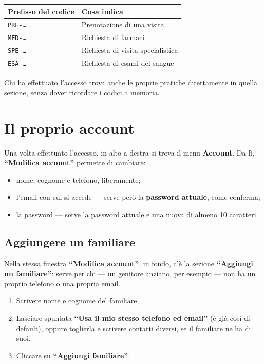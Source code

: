 \documentclass[11pt,a4paper]{article}
\newcommand{\schermata}[1]{\textbf{\color{studioteal}#1}}
\newcommand{\bottone}[1]{\textbf{``#1''}}
\begin{document}
\begin{center}
\begin{tabularx}{\linewidth}{lX}
\toprule
\textbf{Prefisso del codice} & \textbf{Cosa indica} \\
\midrule
\texttt{PRE-\dots} & Prenotazione di una visita \\
\texttt{MED-\dots} & Richiesta di farmaci \\
\texttt{SPE-\dots} & Richiesta di visita specialistica \\
\texttt{ESA-\dots} & Richiesta di esami del sangue \\
\bottomrule
\end{tabularx}
\end{center}

Chi ha effettuato l'accesso trova anche le proprie pratiche direttamente in quella sezione, senza dover ricordare i codici a memoria.

\section{Il proprio account}

Una volta effettuato l'accesso, in alto a destra si trova il menu \schermata{Account}. Da lì, \bottone{Modifica account} permette di cambiare:

\begin{itemize}
  \item nome, cognome e telefono, liberamente;
  \item l'email con cui si accede --- serve però la \textbf{password attuale}, come conferma;
  \item la password --- serve la password attuale e una nuova di almeno 10 caratteri.
\end{itemize}

\subsection{Aggiungere un familiare}

Nella stessa finestra \bottone{Modifica account}, in fondo, c'è la sezione \bottone{Aggiungi un familiare}: serve per chi --- un genitore anziano, per esempio --- non ha un proprio telefono o una propria email.

\begin{enumerate}
  \item Scrivere nome e cognome del familiare.
  \item Lasciare spuntata \bottone{Usa il mio stesso telefono ed email} (è già così di default), oppure toglierla e scrivere contatti diversi, se il familiare ne ha di suoi.
  \item Cliccare su \bottone{Aggiungi familiare}.
\end{enumerate}
\end{document}
